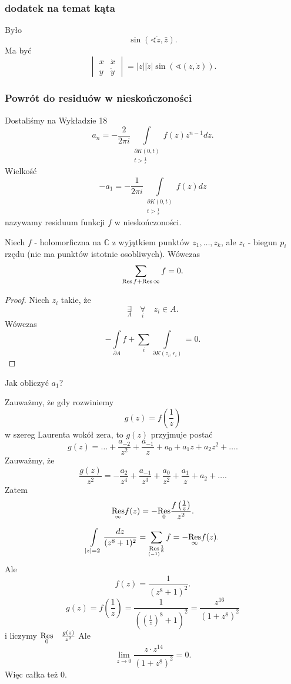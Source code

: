\documentclass[../main.tex]{subfiles}
\begin{document}
    \subsubsection{dodatek na temat kąta}
    Było
    \[
        \sin(\sphericalangle \dot{z}, \bar{z})
    .\]
Ma być
\[
    \begin{vmatrix} x &\dot{x}\\ y & \dot{y} \end{vmatrix} = |z| |\dot{z}| \sin\left( \sphericalangle(z,\dot{z}) \right)
.\]
\subsubsection{Powrót do residuów w nieskończoności}
Dostaliśmy na Wykładzie 18
\[
    a_n = - \frac{2}{2 \pi i} \int\limits_{\substack{\partial K(0,t)\\ t > \frac{1}{r}}} f(z) z^{n-1}dz
.\]
Wielkość
\[
    - a_1 = - \frac{1}{2\pi i}\int\limits_{\substack{\partial K(0,t)\\ t > \frac{1}{r}}}f(z) dz
\]
nazywamy residuum funkcji $f$ w nieskończoności.
\begin{stw}
    Niech $f$ - holomorficzna na $\mathbb{C}$ z wyjątkiem punktów $z_1,\ldots,z_k$, ale $z_i$ - biegun $p_i$ rzędu (nie ma punktów istotnie osobliwych). Wówczas
    \[
    \sum_{\operatorname{Res} f + \operatorname{Res} \infty}f = 0
    .\]
\end{stw}
\begin{proof}
    Niech $z_i$ takie, że
    \[
    \underset{A}{\exists} \quad \underset{i}{\forall}\quad z_i\in A
    .\]
Wówczas
\[
    -\int\limits_{\partial A}f + \sum_i\int\limits_{\partial K(z_i,r_i)} = 0
.\]
\end{proof}
\begin{pytanie}Jak obliczyć $a_1$?\end{pytanie}
    Zauważmy, że gdy rozwiniemy
    \[
        g(z) = f\left(\frac{1}{z}\right)
    \]
    w szereg Laurenta wokół zera, to $g(z)$ przyjmuje postać
    \[
        g(z) = \ldots + \frac{a_{-2}}{z^2} + \frac{a_{-1}}{z} + a_0 + a_1z + a_2z^2 + \ldots
    .\]
Zauważmy, że
\[
    \frac{g(z)}{z^2} = -\frac{a_{2}}{z^4} + \frac{a_{-1}}{z^3} + \frac{a_0}{z^2} + \frac{a_1}{z} + a_2 + \ldots
.\]
Zatem
\[
    \underset{\infty}{\operatorname{Res}} f(z) = - \underset{0}{\operatorname{Res}} \frac{f\left( \frac{1}{z} \right) }{z^2}
.\]
\begin{przyklad}
    \[
        \int\limits_{|z| = 2}\frac{dz}{(z^8 + 1)^2} = \sum\limits_{\underset{(-1)}{\operatorname{Res}} \frac{1}{8}} f = - \underset{\infty}{\operatorname{Res}} f(z)
    .\]
Ale
\[
    f(z) = \frac{1}{(z^8 + 1)^2}
.\]
\[
    g(z) = f\left( \frac{1}{z} \right) = \frac{1}{\left( \left( \frac{1}{z} \right) ^8 + 1 \right) ^2} = \frac{z^{16}}{(1 + z^8)^2}
\]
    i liczymy $\underset{0}{\operatorname{Res}}\quad \frac{g(z)}{z^2}$
    Ale
    \[
        \lim\limits_{z\to 0}\frac{z\cdot z^{14}}{(1+z^8)^2} = 0
    .\]
Więc całka też $0$.
\end{przyklad}
\end{document}
